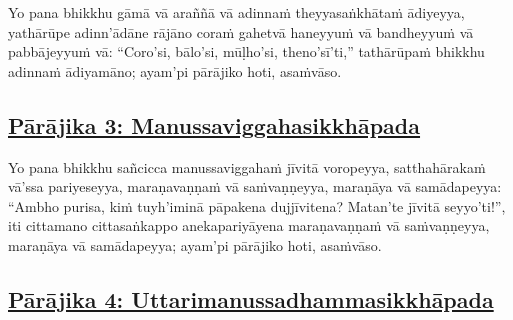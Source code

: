Yo pana bhikkhu gāmā vā araññā vā adinnaṁ theyyasaṅkhātaṁ ādiyeyya, yathārūpe adinn'ādāne rājāno coraṁ gahetvā haneyyuṁ vā bandheyyuṁ vā pabbājeyyuṁ vā: ``Coro'si, bālo'si, mūḷho'si,\makeatletter\hyperlink{endnote31-appendix}\makeatother{} theno'sī'ti,'' tathārūpaṁ bhikkhu adinnaṁ ādiyamāno; ayam'pi pārājiko hoti, asaṁvāso.



\subsection*{\hyperref[disq3]{Pārājika 3: Manussaviggahasikkhāpada}}
\label{par3}

Yo pana bhikkhu sañcicca manussaviggahaṁ jīvitā voropeyya, satthahārakaṁ vā'ssa pariyeseyya, maraṇavaṇṇaṁ vā saṁvaṇṇeyya, maraṇāya vā samādapeyya: ``Ambho purisa, kiṁ tuyh'iminā pāpakena dujjīvitena? Matan'te\makeatletter\hyperlink{endnote32-appendix}\makeatother{} jīvitā seyyo'ti!'', iti cittamano cittasaṅkappo anekapariyāyena maraṇavaṇṇaṁ vā saṁvaṇṇeyya, maraṇāya vā samādapeyya; ayam'pi pārājiko hoti, asaṁvāso.



\subsection*{\hyperref[disq4]{Pārājika 4: Uttarimanussadhammasikkhāpada}}

\label{par4}

